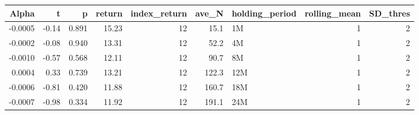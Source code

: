 \begin{table}[ht]
\centering
\begin{tabular}{rrrrrrlrr}
  \hline
Alpha & t & p & return & index\_return & ave\_N & holding\_period & rolling\_mean & SD\_thres \\ 
  \hline
-0.0005 & -0.14 & 0.891 & 15.23 & 12 & 15.1 & 1M &  1 &  2 \\ 
  -0.0002 & -0.08 & 0.940 & 13.31 & 12 & 52.2 & 4M &  1 &  2 \\ 
  -0.0010 & -0.57 & 0.568 & 12.11 & 12 & 90.7 & 8M &  1 &  2 \\ 
  0.0004 & 0.33 & 0.739 & 13.21 & 12 & 122.3 & 12M &  1 &  2 \\ 
  -0.0006 & -0.81 & 0.420 & 11.88 & 12 & 160.7 & 18M &  1 &  2 \\ 
  -0.0007 & -0.98 & 0.334 & 11.92 & 12 & 191.1 & 24M &  1 &  2 \\ 
   \hline
\end{tabular}
\end{table}

